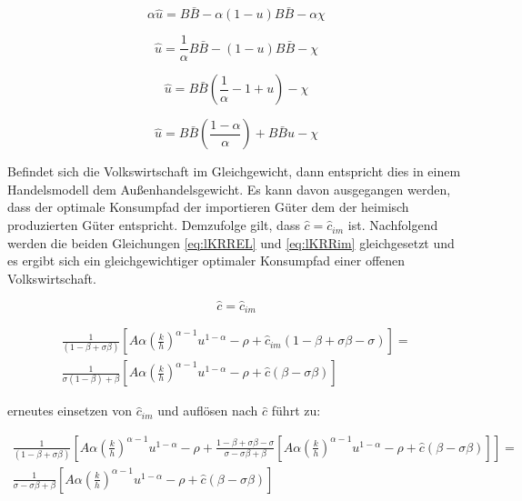 	\begin{equation}
		\alpha \hat{u}=B \bar{B} -\alpha (1-u)B \bar{B} - \alpha \chi  
	\end{equation}


	\begin{equation}
		\hat{u}=\frac{1}{\alpha}B \bar{B} - (1-u)B \bar{B} - \chi 
	\end{equation}


		\begin{equation}
		\hat{u}  =  B \bar{B} (\frac{1}{\alpha}- 1+u)- \chi 
		\end{equation}


	\begin{equation}
		\boxed{\hat{u} = B \bar{B} \left(\frac{1- \alpha}{\alpha}\right) + B \bar{B} u - \chi }
	\end{equation}


Befindet sich die Volkswirtschaft im Gleichgewicht, dann entspricht dies in einem Handelsmodell dem Au{\ss}enhandelsgewicht. Es kann davon ausgegangen werden, dass der optimale Konsumpfad der importieren Güter dem der heimisch produzierten Güter entspricht. Demzufolge gilt, dass $\hat{c}=\hat{c}_{im}$ ist. Nachfolgend werden die beiden Gleichungen  \eqref{eq:lKRREL} und \eqref{eq:lKRRim} gleichgesetzt und es ergibt sich ein gleichgewichtiger optimaler Konsumpfad einer offenen Volkswirtschaft. 


	\begin{equation}
		\hat{c}=\hat{c}_{im}
	\end{equation}


	\begin{equation}
		\begin{split}
			\frac{1}{(1-\beta+\sigma\beta)}\left[A\alpha \left(\frac{k}{h}\right)^{\alpha-1}u^{1- \alpha}-\rho+\hat{c}_{im}(1-\beta+\sigma\beta-\sigma)\right]=\\
			\frac{1}{\sigma(1-\beta)+\beta}\left[A\alpha \left(\frac{k}{h}\right)^{\alpha-1}u^{1- \alpha}-\rho+\hat{c}(\beta-\sigma\beta)\right]
		\end{split}
	\end{equation}


erneutes einsetzen von $\hat{c}_{im}$ und auflösen nach $\hat{c}$ führt zu: 


	\begin{equation*}
		\begin{split}
			\frac{1}{(1-\beta+\sigma\beta)}\left[A\alpha \left(\frac{k}{h}\right)^{\alpha-1}u^{1- \alpha}-\rho+\frac{1-\beta+\sigma\beta-\sigma}{\sigma-\sigma\beta+\beta}\left[A\alpha \left(\frac{k}{h}\right)^{\alpha-1}u^{1- \alpha}-\rho+\hat{c}(\beta-\sigma\beta)\right]\right]=\\
			\frac{1}{\sigma-\sigma\beta+\beta}\left[A\alpha \left(\frac{k}{h}\right)^{\alpha-1}u^{1- \alpha}-\rho+\hat{c}(\beta-\sigma\beta)\right]
		\end{split}
	\end{equation*}


